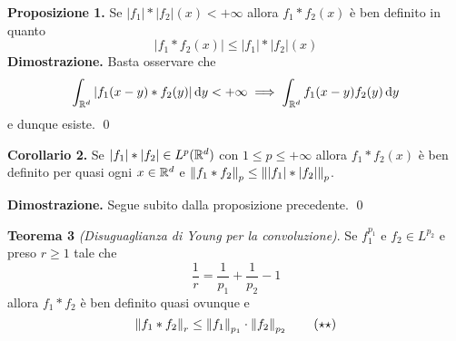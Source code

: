 \documentclass[a4paper, 12pt]{report}
\begin{document}
%
%


\textbf{Proposizione 1.}
Se $|f_1| \ast |f_2| (x) < +\infty$ allora $f_1 \ast f_2(x)$ è ben definito in quanto
$$
|f_1 \ast f_2(x)| \leq |f_1| \ast |f_2|(x)
$$
\textbf{Dimostrazione.}
Basta osservare che
$$
\int_{\mathbb R^d} |f_1(x - y) \ast f_2(y)| \,\mathrm{d} y < +\infty 
\implies \int_{\mathbb R^d} f_1(x - y) f_2(y) \,\mathrm{d} y
$$
e dunque esiste.
\qed

\textbf{Corollario 2.}
Se $|f_1| \ast |f_2| \in L^p(\mathbb R^d)$ con $1 \leq p \leq +\infty$ allora $f_1 \ast f_2(x)$ è ben definito per quasi ogni $x \in \mathbb R^d$ e $\left\lVert f_1 \ast f_2 \right\rVert_p \leq \left\lVert |f_1| \ast |f_2| \right\rVert_p$.

\textbf{Dimostrazione.}
Segue subito dalla proposizione precedente.
\qed

\textbf{Teorema 3} \textit{(Disuguaglianza di Young per la convoluzione)}.
Se $f_1^{p_1}$ e $f_2 \in L^{p_2}$ e preso $r \geq 1$ tale che
\begin{equation}\label{eqn:conv_th3_cond}
	\frac{1}{r} = \frac{1}{p_1} + \frac{1}{p_2} - 1
	\tag{$\star$}
\end{equation}
allora $f_1 \ast f_2$ è ben definito quasi ovunque e
\begin{equation}\label{eqn:conv_th3_thesis}
	\left\lVert f_1 \ast f_2 \right\rVert_r \leq \left\lVert f_1 \right\rVert_{p_1} \cdot \left\lVert f_2 \right\rVert_{p_2}
	\tag{$\star\star$}
\end{equation}
\end{document}
